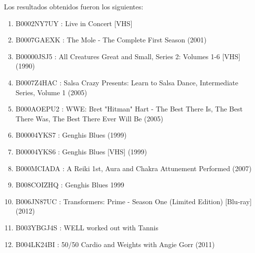 Los resultados obtenidos fueron los siguientes:
\begin{enumerate}
\item B0002NY7UY : Live in Concert [VHS]
\item B0007GAEXK : The Mole - The Complete First Season (2001)
\item B00000JSJ5 : All Creatures Great and Small, Series 2: Volumes 1-6 [VHS] (1990)
\item B0007Z4HAC : Salsa Crazy Presents: Learn to Salsa Dance, Intermediate Series, Volume 1 (2005)
\item B000AOEPU2 : WWE: Bret "Hitman" Hart - The Best There Is, The Best There Was, The Best There Ever Will Be (2005)
\item B00004YKS7 : Genghis Blues (1999)
\item B00004YKS6 : Genghis Blues [VHS] (1999)
\item B000MCIADA : A Reiki 1st, Aura and Chakra Attunement Performed (2007)
\item B008COIZHQ : Genghis Blues 1999
\item B006JN87UC : Transformers: Prime - Season One (Limited Edition) [Blu-ray] (2012)
\item B003YBGJ4S : WELL worked out with Tannis
\item B004LK24BI : 50/50 Cardio and Weights with Angie Gorr (2011)
\end{enumerate}

